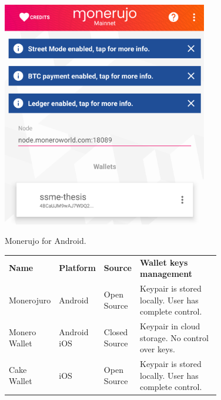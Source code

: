 \documentclass[
  printed, %
  table,   %
  lof,     %
  lot,     %
           oneside, color
]{fithesis3}
\begin{document}
\begin{figure}[H]
\begin{center}
\vspace{-0.75em}
 \includegraphics[trim={0 1.8cm 0 0},clip,width=0.8\textwidth]{Screenshot_1542566492.png}
    \caption{Monerujo for Android.}
    \vspace{-1.5em}
    \label{pic:withoutresdrawable}
\end{center}
    \end{figure}
 \vspace{-0.9em}
\begin{figure}[H]
\centering\begin{tabular}{p{0.2\linewidth}p{0.15\linewidth}p{0.1\linewidth}p{0.4\linewidth}}
\textbf{Name}         & \textbf{Platform}      & \textbf{Source}        & \textbf{Wallet keys management} \\
Monerojuro    & Android       & Open Source   & Keypair is stored locally.  User has complete control.                      \\
Monero Wallet & Android  iOS & Closed Source & Keypair in cloud storage. No control over keys. \\
Cake Wallet   & iOS           & Open Source   & Keypair is stored locally.  User has complete control.                           
\end{tabular}
\label{table:monero-mobile}
\end{figure}
\end{document}
